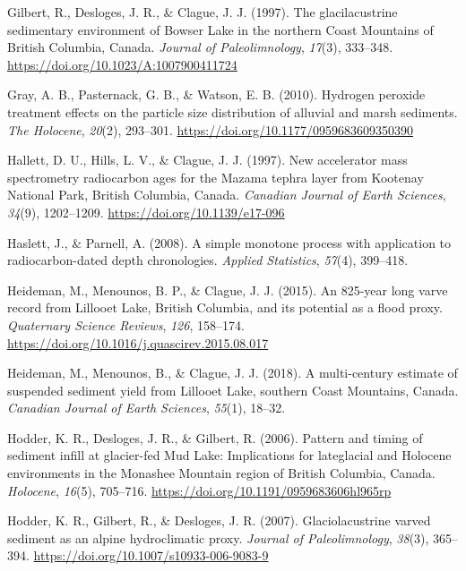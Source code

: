 \documentclass[
  letterpaper,
  DIV=11,
  numbers=noendperiod]{scrartcl}
\newlength{\cslhangindent}
\newlength{\cslentryspacingunit} %
\newenvironment{CSLReferences}[2] %
 {%
  \setlength{\parindent}{0pt}
  \ifodd #1
  \let\oldpar\par
  \def\par{\hangindent=\cslhangindent\oldpar}
  \fi
  \setlength{\parskip}{#2\cslentryspacingunit}
 }%
 {}
\begin{document}
\begin{CSLReferences}{1}{0}
\leavevmode{}%
Gilbert, R., Desloges, J. R., \& Clague, J. J. (1997). {The
glacilacustrine sedimentary environment of Bowser Lake in the northern
Coast Mountains of British Columbia, Canada}. \emph{Journal of
Paleolimnology}, \emph{17}(3), 333--348.
\url{https://doi.org/10.1023/A:1007900411724}

\leavevmode{}%
Gray, A. B., Pasternack, G. B., \& Watson, E. B. (2010). {Hydrogen
peroxide treatment effects on the particle size distribution of alluvial
and marsh sediments}. \emph{The Holocene}, \emph{20}(2), 293--301.
\url{https://doi.org/10.1177/0959683609350390}

\leavevmode{}%
Hallett, D. U., Hills, L. V., \& Clague, J. J. (1997). {New accelerator
mass spectrometry radiocarbon ages for the Mazama tephra layer from
Kootenay National Park, British Columbia, Canada}. \emph{Canadian
Journal of Earth Sciences}, \emph{34}(9), 1202--1209.
\url{https://doi.org/10.1139/e17-096}

\leavevmode{}%
Haslett, J., \& Parnell, A. (2008). {A simple monotone process with
application to radiocarbon-dated depth chronologies}. \emph{Applied
Statistics}, \emph{57}(4), 399--418.

\leavevmode{}%
Heideman, M., Menounos, B. P., \& Clague, J. J. (2015). {An 825-year
long varve record from Lillooet Lake, British Columbia, and its
potential as a flood proxy}. \emph{Quaternary Science Reviews},
\emph{126}, 158--174.
\url{https://doi.org/10.1016/j.quascirev.2015.08.017}

\leavevmode{}%
Heideman, M., Menounos, B., \& Clague, J. J. (2018). {A multi-century
estimate of suspended sediment yield from Lillooet Lake, southern Coast
Mountains, Canada}. \emph{Canadian Journal of Earth Sciences},
\emph{55}(1), 18--32.

\leavevmode{}%
Hodder, K. R., Desloges, J. R., \& Gilbert, R. (2006). {Pattern and
timing of sediment infill at glacier-fed Mud Lake: Implications for
lateglacial and Holocene environments in the Monashee Mountain region of
British Columbia, Canada}. \emph{Holocene}, \emph{16}(5), 705--716.
\url{https://doi.org/10.1191/0959683606hl965rp}

\leavevmode{}%
Hodder, K. R., Gilbert, R., \& Desloges, J. R. (2007). {Glaciolacustrine
varved sediment as an alpine hydroclimatic proxy}. \emph{Journal of
Paleolimnology}, \emph{38}(3), 365--394.
\url{https://doi.org/10.1007/s10933-006-9083-9}


\end{CSLReferences}
\end{document}
